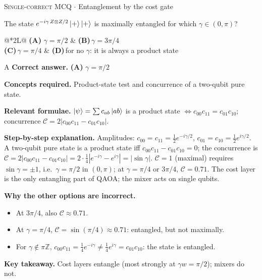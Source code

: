 \documentclass[11pt,a4paper]{article}
\newcommand{\optlabel}[1]{\textbf{(#1)}}
\newcommand{\correctlabel}[1]{\textcolor{okgreen}{\textbf{(#1)}\,\ding{51}}}
\newenvironment{qitem}[1]{\begin{list}{}{\setlength{\leftmargin}{3.3em}\setlength{\labelwidth}{3.1em}%
  \setlength{\labelsep}{0.2em}\setlength{\topsep}{3pt}\setlength{\parsep}{3pt}}\item[\textbf{Q.#1}\hfill]}{\end{list}}
\newcommand{\qsep}{\par\vspace{2pt}{\color{black!15}\hrule}\vspace{4pt}}
\newcommand{\qmeta}[2]{{\footnotesize\color{black!60}\textsc{#1} \;$\cdot$\; #2}\par}
\begin{document}
\begin{qitem}{28}
\qmeta{Single-correct MCQ}{Entanglement by the cost gate}
The state $e^{-i\gamma\, Z\otimes Z/2}\ket{+}\ket{+}$ is maximally entangled for which $\gamma \in (0, \pi)$?
\par\smallskip\noindent\begin{tabularx}{\linewidth}{@{}*{2}{L}@{}}
\correctlabel{A}\,$\gamma = \pi/2$ & \optlabel{B}\,$\gamma = 3\pi/4$ \\[3pt]
\optlabel{C}\,$\gamma = \pi/4$ & \optlabel{D}\,for no $\gamma$: it is always a product state
\end{tabularx}
\end{qitem}
\begin{solbox}{A}
\textbf{\color{brand}Correct answer.} \textcolor{okgreen}{\textbf{(A)}} $\gamma = \pi/2$

\textbf{\color{brand}Concepts required.} Product-state test and concurrence of a two-qubit pure state.

\textbf{\color{brand}Relevant formulae.} $\ket\psi = \sum c_{ab}\ket{ab}$ is a product state $\iff c_{00}c_{11} = c_{01}c_{10}$; concurrence $\mathcal C = 2|c_{00}c_{11} - c_{01}c_{10}|$.

\textbf{\color{brand}Step-by-step explanation.} Amplitudes: $c_{00} = c_{11} = \tfrac12 e^{-i\gamma/2}$, $c_{01} = c_{10} = \tfrac12 e^{i\gamma/2}$.
A two-qubit pure state is a product state iff $c_{00}c_{11} - c_{01}c_{10} = 0$; the concurrence is
$\mathcal C = 2|c_{00}c_{11} - c_{01}c_{10}| = 2\cdot\tfrac14|e^{-i\gamma} - e^{i\gamma}| = |\sin\gamma|$.
$\mathcal C = 1$ (maximal) requires $\sin\gamma = \pm1$, i.e.\ $\gamma = \pi/2$ in $(0, \pi)$; at $\gamma = \pi/4$ or $3\pi/4$, $\mathcal C = 0.71$.
The cost layer is the only entangling part of QAOA; the mixer acts on single qubits.

\textbf{\color{brand}Why the other options are incorrect.}
\begin{itemize}[leftmargin=2.4em, itemsep=1pt, topsep=2pt]
\item[\textbf{(B)}] At $3\pi/4$, also $\mathcal C \approx 0.71$.
\item[\textbf{(C)}] At $\gamma = \pi/4$, $\mathcal C = \sin(\pi/4) \approx 0.71$: entangled, but not maximally.
\item[\textbf{(D)}] For $\gamma \notin \pi\mathbb Z$, $c_{00}c_{11} = \frac14 e^{-i\gamma} \neq \frac14 e^{i\gamma} = c_{01}c_{10}$: the state is entangled.
\end{itemize}
\textbf{\color{brand}Key takeaway.} Cost layers entangle (most strongly at $\gamma w = \pi/2$); mixers do not.
\end{solbox}
\qsep
\end{document}

